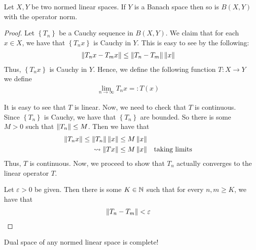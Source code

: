 \begin{lemma}
    Let $X,Y$ be two normed linear spaces. If $Y$ is a Banach space then so is $B(X,Y)$ with the operator norm.
    \label{lem:B(X,Y)-banach}
\end{lemma}
\begin{proof}
    Let $\left\{ T_{n} \right\}$ be a Cauchy sequence in $B(X,Y)$. We claim that for each $x\in X$, we have that $\left\{ T_{n}x \right\}$ is Cauchy in $Y$. This is easy to see by the following:
    \begin{align*}
	\left\lVert T_{n} x -  T_{m} x \right\rVert \le \left\lVert T_{n} - T_{m} \right\rVert \left\lVert x \right\rVert
    \end{align*}
    Thus, $\left\{ T_{n}x \right\}$ is Cauchy in $Y$. Hence, we define the following function $T: X\to Y$ we define 
    \begin{align*}
	\lim_{n\to \infty} T_{n} x =: T (x)
    \end{align*}

It is easy to see that $T$ is linear. Now, we need to check that $T$ is continuous. Since $\left\{ T_{n} \right\}$ is Cauchy, we have that $\left\{ T_{n} \right\}$ are bounded. So there is some $M>0$ such that $\left\lVert T_{n} \right\rVert \le M$. Then we have that 
\begin{align*}
    \left\lVert T_{n} x \right\rVert \le \left\lVert T_{n} \right\rVert \left\lVert x \right\rVert &\le M \left\lVert x \right\rVert \\
    \leadsto \left\lVert Tx \right\rVert &\le M \left\lVert x \right\rVert & \text{taking limits}
\end{align*}
Thus, $T$ is continuous. Now, we proceed to show that $T_{n}$ actually converges to the linear operator $T$.

Let $\varepsilon > 0$ be given. Then there is some $K \in \mathbb N$ such that for every $n,m\ge K$, we have that
\begin{align*}
    \left\lVert T_{n} - T_{m} \right\rVert < \varepsilon
\end{align*}

\end{proof}

\begin{corollary}
    Dual space of any normed linear space is complete!
    \label{cor:dual-space-is-complete}
\end{corollary}



